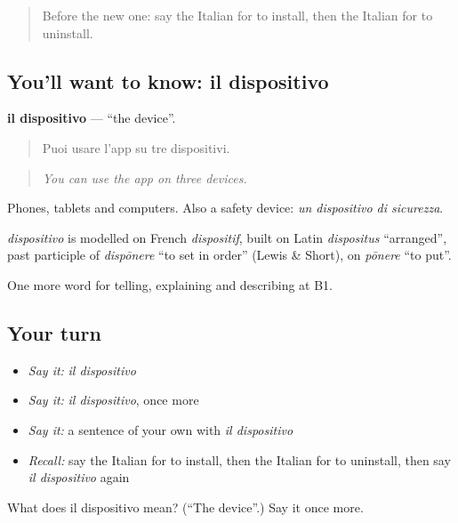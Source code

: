 \begin{quote}
Before the new one: say the Italian for to install, then the Italian for to uninstall.
\end{quote}

\subsection*{You'll want to know: il dispositivo}
\textbf{il dispositivo} — \textquotedblleft{}the device\textquotedblright{}.

\begin{quote}
Puoi usare l'app su tre dispositivi.
\end{quote}

\begin{quote}
\emph{You can use the app on three devices.}
\end{quote}

Phones, tablets and computers. Also a safety device: \emph{un dispositivo di sicurezza}.

\begin{cousinweb}
\emph{dispositivo} is modelled on French \emph{dispositif}, built on Latin \emph{dispositus} \textquotedblleft{}arranged\textquotedblright{}, past participle of \emph{dispōnere} \textquotedblleft{}to set in order\textquotedblright{} (Lewis \& Short), on \emph{pōnere} \textquotedblleft{}to put\textquotedblright{}.
\end{cousinweb}

\begin{grammarlens}[title={What you've built}]
One more word for telling, explaining and describing at B1.
\end{grammarlens}

\subsection*{Your turn}
\begin{itemize}
\raggedright
  \item \emph{Say it:} \emph{il dispositivo}
  \item \emph{Say it:} \emph{il dispositivo}, once more
  \item \emph{Say it:} a sentence of your own with \emph{il dispositivo}
  \item \emph{Recall:} say the Italian for to install, then the Italian for to uninstall, then say \emph{il dispositivo} again
\end{itemize}

\begin{tcolorbox}[breakable,colback=teal!4,colframe=teal!35!black,title={Before you move on}]
What does il dispositivo mean? (\textquotedblleft{}The device\textquotedblright{}.) Say it once more.
\end{tcolorbox}

